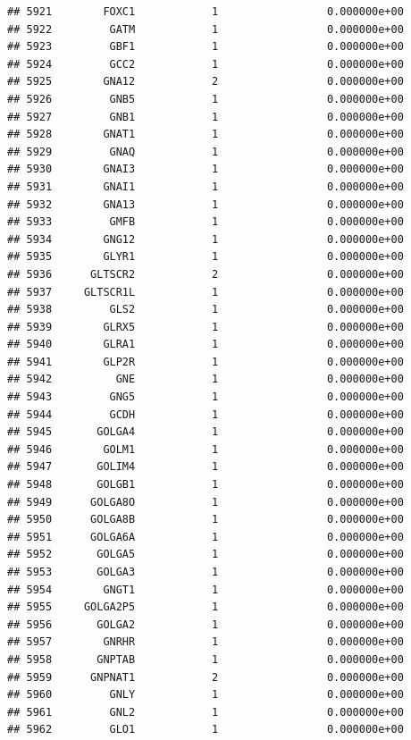 \documentclass[
]{article}
\begin{document}
\begin{verbatim}
## 5921        FOXC1            1                 0.000000e+00
## 5922         GATM            1                 0.000000e+00
## 5923         GBF1            1                 0.000000e+00
## 5924         GCC2            1                 0.000000e+00
## 5925        GNA12            2                 0.000000e+00
## 5926         GNB5            1                 0.000000e+00
## 5927         GNB1            1                 0.000000e+00
## 5928        GNAT1            1                 0.000000e+00
## 5929         GNAQ            1                 0.000000e+00
## 5930        GNAI3            1                 0.000000e+00
## 5931        GNAI1            1                 0.000000e+00
## 5932        GNA13            1                 0.000000e+00
## 5933         GMFB            1                 0.000000e+00
## 5934        GNG12            1                 0.000000e+00
## 5935        GLYR1            1                 0.000000e+00
## 5936      GLTSCR2            2                 0.000000e+00
## 5937     GLTSCR1L            1                 0.000000e+00
## 5938         GLS2            1                 0.000000e+00
## 5939        GLRX5            1                 0.000000e+00
## 5940        GLRA1            1                 0.000000e+00
## 5941        GLP2R            1                 0.000000e+00
## 5942          GNE            1                 0.000000e+00
## 5943         GNG5            1                 0.000000e+00
## 5944         GCDH            1                 0.000000e+00
## 5945       GOLGA4            1                 0.000000e+00
## 5946        GOLM1            1                 0.000000e+00
## 5947       GOLIM4            1                 0.000000e+00
## 5948       GOLGB1            1                 0.000000e+00
## 5949      GOLGA8O            1                 0.000000e+00
## 5950      GOLGA8B            1                 0.000000e+00
## 5951      GOLGA6A            1                 0.000000e+00
## 5952       GOLGA5            1                 0.000000e+00
## 5953       GOLGA3            1                 0.000000e+00
## 5954        GNGT1            1                 0.000000e+00
## 5955     GOLGA2P5            1                 0.000000e+00
## 5956       GOLGA2            1                 0.000000e+00
## 5957        GNRHR            1                 0.000000e+00
## 5958       GNPTAB            1                 0.000000e+00
## 5959      GNPNAT1            2                 0.000000e+00
## 5960         GNLY            1                 0.000000e+00
## 5961         GNL2            1                 0.000000e+00
## 5962         GLO1            1                 0.000000e+00

\end{verbatim}
\end{document}
